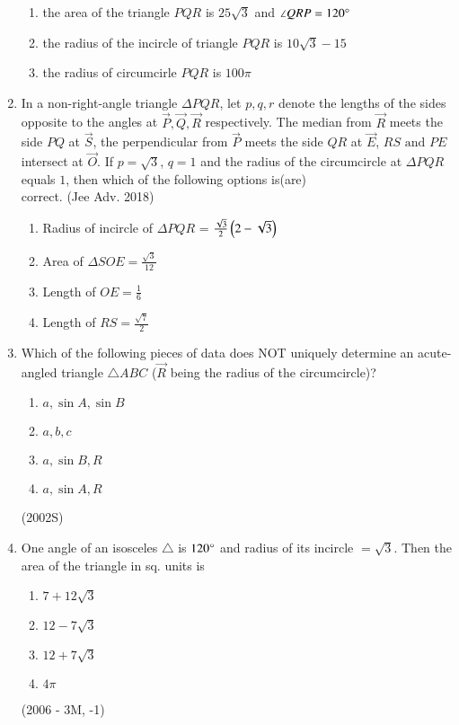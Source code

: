 \begin{enumerate}[label=\thesubsection.\arabic*,ref=\thesubsection.\theenumi]
\begin{enumerate}
    	\item the area of the triangle $PQR$ is $25\sqrt{3}$ and $\angle QRP = 120\degree$
    	\item the radius of the incircle of triangle $PQR$ is $10\sqrt{3}-15$
    	\item the radius of circumcirle $PQR$ is $100\pi$
    \end{enumerate}
    \item In a non-right-angle triangle $\Delta PQR$, let $p,q,r$ denote the lengths of the sides opposite to the angles at $\vec{P},\vec{Q},\vec{R}$ respectively. The median from $\vec{R}$ meets the side $PQ$ at $\vec{S}$, the perpendicular from $\vec{P}$ meets the side $QR$ at $\vec{E}$, $RS \text{ and } PE$ intersect at $\vec{O}$. If $p = \sqrt{3}$, $q = 1$ and the radius of the circumcircle at $\Delta PQR$ equals $1$, then which of the following options is(are)\\ correct.
    \hfill{(Jee Adv. 2018)}
    \begin{enumerate}
    	\item Radius of incircle of $\Delta PQR$ = $\frac{\sqrt{3}}{2}\left(2-\sqrt{3}\right)$
    	\item Area of $\Delta SOE = \frac{\sqrt{3}}{12}$
    	\item Length of $OE = \frac{1}{6}$
    	\item Length of $RS = \frac{\sqrt{7}}{2}$
    \end{enumerate}
\item Which of the following pieces of data does NOT uniquely determine an acute-angled triangle $\triangle ABC$ ($\vec{R}$ being the radius of the circumcircle)?
\begin{enumerate}
\item $a, \sin A, \sin B$
\item $a, b, c$
\item $a, \sin B, R$
\item $a, \sin A, R$
\end{enumerate}
\hfill (2002S)
\item One angle of an isosceles $\triangle$ is $120\degree$ and radius of its incircle $= \sqrt{3}$. Then the area of the triangle in sq. units is 
\begin{enumerate}
\item $7+12\sqrt{3}$
\item $12-7\sqrt{3}$
\item $12+7\sqrt{3}$
\item $4\pi$
\end{enumerate}
\hfill (2006 - 3M, -1)


\end{enumerate}
